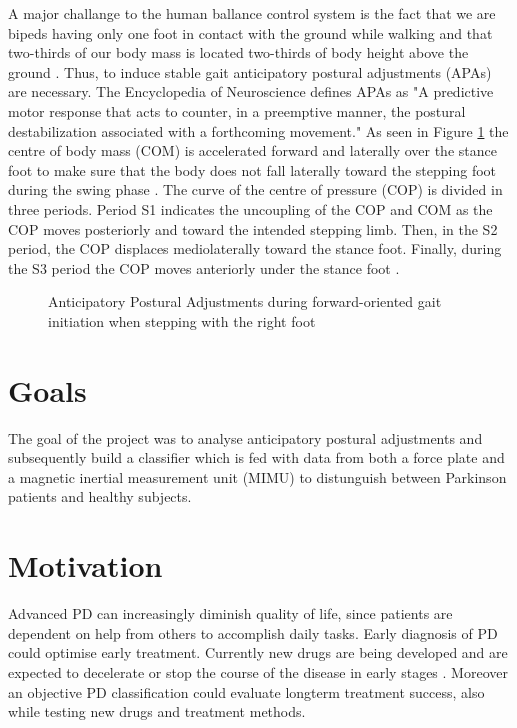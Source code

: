 A major challange to the human ballance control system is the fact that we are bipeds having only one foot in contact with the ground while walking and that two-thirds  of our body mass is located two-thirds of body height above the ground \cite{halliday_initiation_1998}. Thus, to induce stable gait anticipatory postural adjustments (APAs) are necessary. The Encyclopedia of Neuroscience \cite[p.133]{woollacott_anticipatory_2009} defines APAs as "A predictive motor response that acts to counter, in a preemptive manner, the postural destabilization associated with a forthcoming movement." As seen in Figure \ref{fig:APAoverview} the centre of body mass (COM) is accelerated forward and laterally over the stance foot to make sure that the body does not fall laterally toward the stepping foot during the swing phase \cite{woollacott_anticipatory_2009}.  The curve of the centre of pressure (COP) is divided in three periods. Period S1 indicates the uncoupling of the COP and COM as the COP moves posteriorly and toward the intended stepping limb. Then, in the S2 period, the COP displaces mediolaterally toward the stance foot. Finally, during the S3 period the COP moves anteriorly under the stance foot \cite{hass_gait_2005-1}.

\begin{figure}
	\centering
	\caption{Anticipatory Postural Adjustments during forward-oriented gait initiation when stepping with the right foot \cite{hass_gait_2005-1}}
	\label{fig:APAoverview}
\end{figure}


\section{Goals}

The goal of the project was to analyse anticipatory postural adjustments and subsequently build a classifier which is fed with data from both a force plate and a magnetic inertial measurement unit (MIMU) to distunguish between Parkinson patients and healthy subjects.


\section{Motivation}

Advanced PD can increasingly diminish quality of life, since patients are dependent on help from others to accomplish daily tasks. Early diagnosis of PD could optimise early treatment. Currently new drugs are being developed and are expected to decelerate or stop the course of the disease in early stages \cite{botzel_motivation_2014}. Moreover an objective PD classification could evaluate longterm treatment success, also while testing new drugs and treatment methods.


